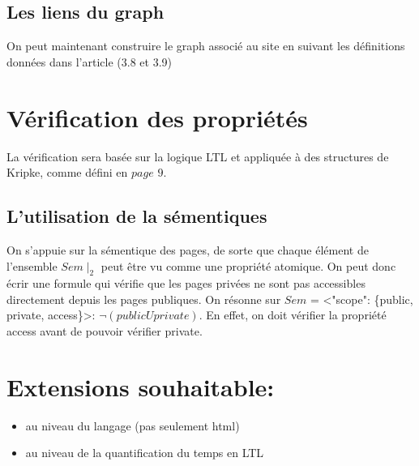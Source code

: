 \documentclass[a4paper]{article}
\begin{document}
\subsection*{ Les liens du graph\\ }
On peut maintenant construire le graph associé au site en suivant les définitions données dans l'article (3.8 et 3.9)\\
\section*{ Vérification des propriétés \\ }
La vérification sera basée sur la logique LTL et appliquée à des structures de Kripke, comme défini en $page$ $9$.\\
\subsection*{ L'utilisation de la sémentiques }
On s'appuie sur la sémentique des pages, de sorte que chaque élément de l'ensemble $Sem \mid_2$ peut être vu comme une propriété atomique. On peut donc écrir une formule qui vérifie que les pages privées ne sont pas accessibles directement depuis les pages publiques. On résonne sur $Sem$ = <"scope": \{public, private, access\}>: $\neg(public U private)$. En effet, on doit vérifier la propriété access avant de pouvoir vérifier private.\\
\section*{ Extensions souhaitable: }
\begin{itemize}
\item au niveau du langage (pas seulement html)
\item au niveau de la quantification du temps en LTL
\end{itemize}
\end{document}
